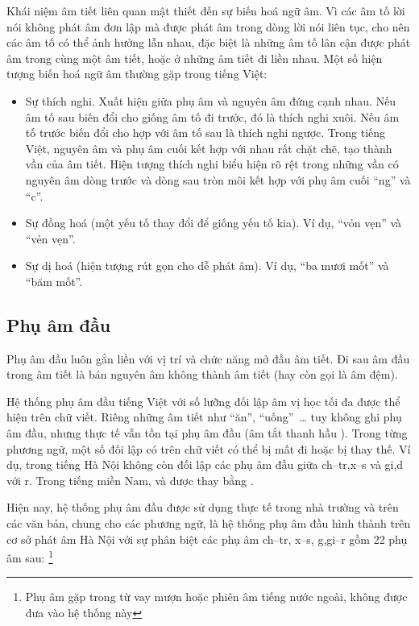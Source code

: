 \documentclass[a4paper,oneside,14pt]{extbook} %
\begin{document}



Khái niệm âm tiết liên quan mật thiết đến sự biến hoá ngữ âm. Vì các
âm tố lời nói không phát âm đơn lập mà được phát âm trong dòng lời nói
liên tục, cho nên các âm tố có thể ảnh hưởng lẫn nhau, đặc biệt là
những âm tố lân cận được phát âm trong cùng một âm tiết, hoặc ở những
âm tiết đi liền nhau. Một số hiện tượng biến hoá ngữ âm thường gặp
trong tiếng Việt:
\begin{itemize}
\item Sự thích nghi. Xuất hiện giữa phụ âm và nguyên âm đứng cạnh
  nhau. Nếu âm tố sau biến đổi cho giống âm tố đi trước, đó là thích
  nghi xuôi. Nếu âm tố trước biến đổi cho hợp với âm tố sau là thích
  nghi ngược. Trong tiếng Việt, nguyên âm và phụ âm cuối kết hợp với
  nhau rất chặt chẽ, tạo thành vần của âm tiết. Hiện tượng thích nghi
  biểu hiện rõ rệt trong những vần có nguyên âm dòng trước và dòng sau
  tròn môi kết hợp với phụ âm cuối ``ng'' và ``c''.
\item Sự đồng hoá (một yếu tố thay đổi để giống yếu tố kia). Ví dụ,
  ``vỏn vẹn'' và ``vẻn vẹn''.
\item Sự dị hoá (hiện tượng rút gọn cho dễ phát âm). Ví dụ, ``ba mươi
  mốt'' và ``băm mốt''.
\end{itemize}

\subsection{Phụ âm đầu}

Phụ âm đầu luôn gắn liền với vị trí và chức năng mở đầu âm tiết. Đi
sau âm đầu trong âm tiết là bán nguyên âm không thành âm tiết (hay còn
gọi là âm đệm).

Hệ thống phụ âm đầu tiếng Việt với số lưỡng đối lập âm vị học tối đa
được thể hiện trên chữ viết. Riêng những âm tiết như ``ăn'',
``uống''~\ldots{} tuy không ghi phụ âm đầu, nhưng thực tế vẫn tồn tại
phụ âm đầu (âm tắt thanh hầu ). Trong từng phương ngữ,
một số đối lập có trên chữ viết có thể bị mất đi hoặc bị thay thế. Ví
dụ, trong tiếng Hà Nội không còn đối lập các phụ âm đầu giữa
ch--tr,x--s và gi,d với r. Trong tiếng miền Nam,  và
 được thay bằng .

Hiện nay, hệ thống phụ âm đầu được sử dụng thực tế trong nhà trường và
trên các văn bản, chung cho các phương ngữ, là hệ thống phụ âm đầu
hình thành trên cơ sở phát âm Hà Nội với sự phân biệt các phụ âm
ch--tr, x--s, g,gi--r gồm 22 phụ âm sau: \footnote{Phụ âm  gặp trong từ vay mượn hoặc
  phiên âm tiếng nước ngoài, không được đưa vào hệ thống này}
\end{document}
